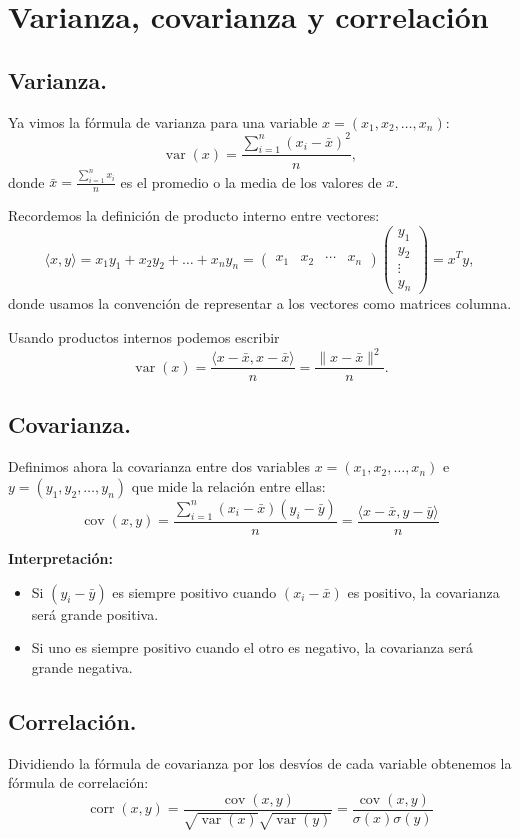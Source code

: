 \documentclass[a4paper]{article}
\DeclareMathOperator{\var}{var}
\DeclareMathOperator{\cov}{cov}
\DeclareMathOperator{\corr}{corr}
\begin{document}
\section{Varianza, covarianza y correlación}

\subsection{Varianza.}
Ya vimos la f\'ormula de varianza para una variable $x = (x_1, x_2, \dots, x_n)$:
$$
\var(x) = \frac{\sum_{i=1}^n(x_i - \bar x)^2}{n},
$$
donde $\bar x = \frac{\sum_{i = 1}^n x_i}{n}$ es el promedio o la media de los valores de $x$.

Recordemos la definición de producto interno entre vectores:
$$\langle x, y\rangle = x_1 y_1 + x_2 y_2 + \dots + x_n y_n = \begin{pmatrix} x_1 & x_2 & \cdots & x_n \end{pmatrix} \begin{pmatrix} y_1 \\ y_2 \\ \vdots \\ y_n \end{pmatrix} = x^T y,$$
donde usamos la convención de representar a los vectores como matrices columna.

Usando productos internos podemos escribir
$$
\var(x) = \frac{\langle x - \bar x,  x - \bar x \rangle}{n} = \frac{\| x - \bar x\|^2}{n}.
$$


\subsection{Covarianza.} Definimos ahora la covarianza entre dos variables $x = (x_1, x_2, \dots, x_n)$ e $y = (y_1, y_2, \dots, y_n)$ que mide la relaci\'on entre ellas:
$$
\cov(x,y) = \frac{\sum_{i = 1}^n (x_i - \bar x)(y_i - \bar y)}{n}= \frac{\langle x - \bar x , y - \bar y \rangle}{n}
$$

\textbf{Interpretaci\'on:}
\begin{itemize}
\item Si $(y_i - \bar y)$ es siempre positivo cuando $(x_i - \bar x)$ es positivo, la covarianza será grande positiva.
\item Si uno es siempre positivo cuando el otro es negativo, la covarianza será grande negativa.
\end{itemize}

\subsection{Correlaci\'on.} Dividiendo la fórmula de covarianza por los desvíos de cada variable obtenemos la fórmula de correlación:
$$
\corr(x,y) = \frac{\cov(x, y)}{\sqrt{\var(x)}\sqrt{\var(y)}} = \frac{\cov(x, y)}{\sigma(x)\sigma(y)}
$$
\end{document}
